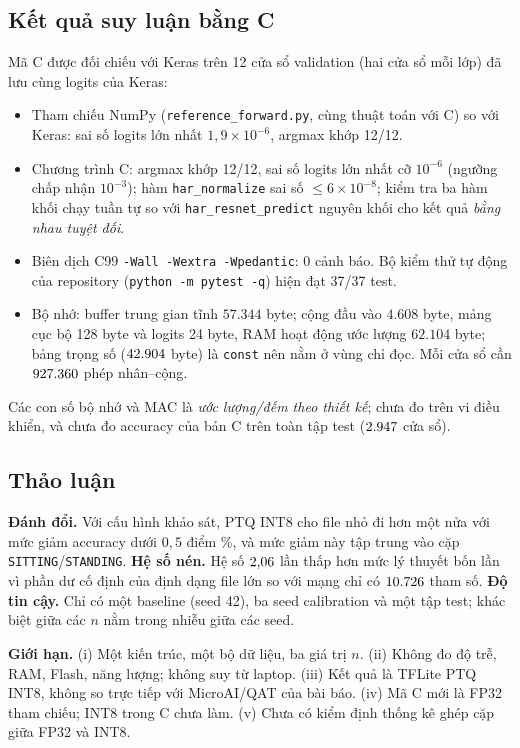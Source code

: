 \documentclass[12pt,a4paper]{article}
\newcommand{\code}[1]{\texttt{#1}}
\begin{document}
\subsection{Kết quả suy luận bằng C}
Mã C được đối chiếu với Keras trên 12 cửa sổ validation (hai cửa sổ mỗi lớp) đã lưu cùng logits của Keras:
\begin{itemize}
  \item Tham chiếu NumPy (\code{reference\_forward.py}, cùng thuật toán với C) so với Keras: sai số logits lớn nhất $1{,}9\times10^{-6}$, argmax khớp 12/12.
  \item Chương trình C: argmax khớp 12/12, sai số logits lớn nhất cỡ $10^{-6}$ (ngưỡng chấp nhận $10^{-3}$); hàm \code{har\_normalize} sai số $\le6\times10^{-8}$; kiểm tra ba hàm khối chạy tuần tự so với \code{har\_resnet\_predict} nguyên khối cho kết quả \emph{bằng nhau tuyệt đối}.
  \item Biên dịch C99 \code{-Wall -Wextra -Wpedantic}: 0 cảnh báo. Bộ kiểm thử tự động của repository (\code{python -m pytest -q}) hiện đạt 37/37 test.
  \item Bộ nhớ: buffer trung gian tĩnh $57.344$ byte; cộng đầu vào $4.608$ byte, mảng cục bộ 128 byte và logits 24 byte, RAM hoạt động ước lượng $62.104$ byte; bảng trọng số ($\mbox{42.904}$ byte) là \code{const} nên nằm ở vùng chỉ đọc. Mỗi cửa sổ cần $\mbox{927.360}$ phép nhân--cộng.
\end{itemize}
Các con số bộ nhớ và MAC là \emph{ước lượng/đếm theo thiết kế}; chưa đo trên vi điều khiển, và chưa đo accuracy của bản C trên toàn tập test ($\mbox{2.947}$ cửa sổ).

\subsection{Thảo luận}
\textbf{Đánh đổi.} Với cấu hình khảo sát, PTQ INT8 cho file nhỏ đi hơn một nửa với mức giảm accuracy dưới $0{,}5$ điểm \%, và mức giảm này tập trung vào cặp \code{SITTING}/\code{STANDING}. \textbf{Hệ số nén.} Hệ số $\mbox{2,06}$ lần thấp hơn mức lý thuyết bốn lần vì phần dư cố định của định dạng file lớn so với mạng chỉ có $\mbox{10.726}$ tham số. \textbf{Độ tin cậy.} Chỉ có một baseline (seed 42), ba seed calibration và một tập test; khác biệt giữa các $n$ nằm trong nhiễu giữa các seed.

\textbf{Giới hạn.} (i) Một kiến trúc, một bộ dữ liệu, ba giá trị $n$. (ii) Không đo độ trễ, RAM, Flash, năng lượng; không suy từ laptop. (iii) Kết quả là TFLite PTQ INT8, không so trực tiếp với MicroAI/QAT của bài báo. (iv) Mã C mới là FP32 tham chiếu; INT8 trong C chưa làm. (v) Chưa có kiểm định thống kê ghép cặp giữa FP32 và INT8.
\end{document}
